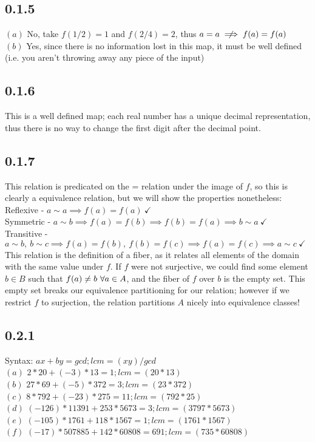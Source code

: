 \documentclass[11pt]{article}
\begin{document}
	\subsection*{0.1.5}
		$(a)$ No, take $f(1/2) = 1$ and $f(2/4) = 2$, thus $ a = a \centernot \implies f(a) = f(a)$\\
		$(b)$ Yes, since there is no information lost in this map, it must be well defined (i.e. you aren't throwing away any piece of the input)\\
	\subsection*{0.1.6}
		This is a well defined map; each real number has a unique decimal representation, thus there is no way to change the first digit after the decimal point.\\
	\clearpage
	\subsection*{0.1.7}
		This relation is predicated on the = relation under the image of $f$, so this is clearly a equivalence relation, but we will show the properties nonetheless:\\
		\indent Reflexive - $a \sim a \implies f(a) = f(a) \ \checkmark$ \\
		\indent Symmetric - $a \sim b \implies f(a) = f(b) \implies f(b) = f(a) \implies b \sim a \ \checkmark$ \\
		\indent Transitive - $a \sim b,\  b \sim c \implies f(a) = f(b), \ f(b) = f(c) \implies f(a) = f(c) \implies a \sim c\ \checkmark$ \\
		This relation is the definition of a fiber, as it relates all elements of the domain with the same value under $f$.  If $f$ were not surjective,
		we could find some element $b \in B$ such that $f(a) \centernot = b \ \forall a \in A$, and the fiber of $f$ over $b$ is the empty set. 
		This empty set breaks our equivalence partitioning for our relation; however if we restrict $f$ to surjection, the relation partitions $A$ nicely into equivalence classes!
	\subsection*{0.2.1}
		\indent Syntax: $ax + by = gcd; lcm = (xy)/gcd$\\
		$(a)$ $2*20 + (-3)*13 = 1; lcm = (20*13)$\\
		$(b)$ $27*69 + (-5)*372  = 3; lcm = (23*372)$\\
		$(c)$ $8*792 + (-23)*275 = 11; lcm = (792*25)$\\
		$(d)$ $(-126)*11391 + 253*5673 = 3; lcm = (3797*5673)$\\
		$(e)$ $(-105)*1761 + 118*1567 = 1; lcm = (1761*1567)$\\
		$(f)$ $(-17)*507885 + 142*60808 = 691; lcm = (735*60808)$
\end{document}
